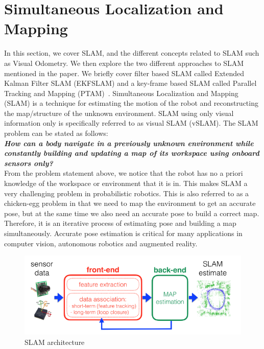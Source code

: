 \section{Simultaneous Localization and Mapping}
\label{slam}

In this section, we cover SLAM, and the different concepts related to SLAM such as Visual Odometry. We then explore the two different approaches to SLAM mentioned in the paper. We briefly cover filter based SLAM called Extended Kalman Filter SLAM (EKFSLAM) and a key-frame based SLAM called Parallel Tracking and Mapping (PTAM)~\cite{klein2007parallel}. Simultaneous Localization and Mapping (SLAM) is a technique for estimating the motion of the robot and reconstructing the map/structure of the unknown environment. SLAM using only visual information only is specifically referred to as visual SLAM (vSLAM). The SLAM problem can be stated as follows:\\

\textbf{\emph{How can a body navigate in a previously unknown environment while constantly building and updating a map of its workspace using onboard sensors only?} ~\cite{chli2017}}\\

From the problem statement above, we notice that the robot has no a priori knowledge of the workspace or environment that it is in. This makes SLAM a very challenging problem in probabilistic robotics. This is also referred to as a chicken-egg problem in that we need to map the environment to get an accurate pose, but at the same time we also need an accurate pose to build a correct map. Therefore, it is an iterative process of estimating pose and building a map simultaneously. Accurate pose estimation is critical for many applications in computer vision, autonomous robotics and augmented reality.
  

\begin{figure}
  \includegraphics[width=\textwidth]{./figures/slam_model.png}
\caption{SLAM architecture}
\label{fig:slammodel}       %
\end{figure}

